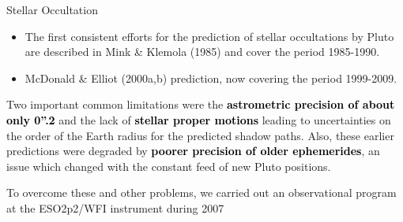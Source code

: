 \begin{frame}[c]{Stellar Occultation}{}

\begin{itemize}
	\item The first consistent efforts for the prediction of stellar occultations by Pluto are described in Mink \& Klemola (1985) and cover the period 1985-1990.
	\item McDonald \& Elliot (2000a,b) prediction, now covering the period 1999-2009.
\end{itemize}
\pause
\begin{alertblock}{}
	Two important common limitations were the  \textcolor{black}{\textbf{astrometric precision of about only 0''.2}} and the lack of \textcolor{black}{\textbf{stellar proper motions}} leading to uncertainties on the order of the Earth radius for the predicted shadow paths. Also, these earlier predictions were degraded by \textcolor{black}{\textbf{poorer precision of older ephemerides}}, an issue which changed with the constant feed of new Pluto positions.
\end{alertblock}	
\pause
	\begin{block}{}
		To overcome these and other problems, we carried out an observational program at the ESO2p2/WFI instrument during 2007
	\end{block}
\end{frame}



